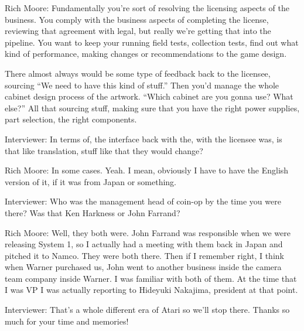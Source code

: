 \textcolor{interviewee}{Rich Moore:} Fundamentally you’re sort of resolving the licensing aspects of the business. You comply with the business aspects of completing the license, reviewing that agreement with legal, but really we're getting that into the pipeline. You want to keep your running field tests, collection tests, find out what kind of performance, making changes or recommendations to the game design. 

There almost always would be some type of feedback back to the licensee, sourcing “We need to have this kind of stuff.” Then you'd manage the whole cabinet design process of the artwork. “Which cabinet are you gonna use? What else?” All that sourcing stuff, making sure that you have the right power supplies, part selection, the right components.

\textcolor{interviewer}{Interviewer:} In terms of, the interface back with the, with the licensee was, is that like translation, stuff like that they would change?

\textcolor{interviewee}{Rich Moore:} In some cases. Yeah. I mean, obviously I have to have the English version of it, if it was from Japan or something.

\textcolor{interviewer}{Interviewer:} Who was the management head of coin-op by the time you were there? Was that Ken Harkness or John Farrand?

\textcolor{interviewee}{Rich Moore:} Well, they both were. John Farrand was responsible when we were releasing System 1, so I actually had a meeting with them back in Japan and pitched it to Namco. They were both there. Then if I remember right, I think when Warner purchased us, John went to another business inside the camera team company inside Warner. I was familiar with both of them. At the time that I was VP I was actually reporting to Hideyuki Nakajima, president at that point.

\textcolor{interviewer}{Interviewer:} That’s a whole different era of Atari so we’ll stop there. Thanks so much for your time and memories!